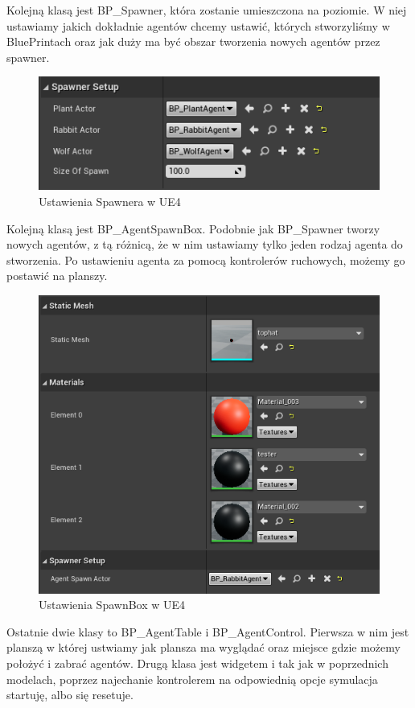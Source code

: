 \documentclass[a4paper,12pt,reqno]{article}
\begin{document}
Kolejną klasą jest BP\_Spawner, która zostanie umieszczona na poziomie. W niej ustawiamy jakich dokładnie agentów chcemy ustawić, których stworzyliśmy w BluePrintach oraz jak duży ma być obszar tworzenia nowych agentów przez spawner.

\begin{figure}[H]%
\centering
\includegraphics[width=0.6\columnwidth]{graphics//agent/BP_SpawnerAgent.png}
\caption{Ustawienia Spawnera w UE4 
\label{BPExample}}%
%
\qquad
\end{figure} 

Kolejną klasą jest BP\_AgentSpawnBox. Podobnie jak BP\_Spawner tworzy nowych agentów, z tą różnicą, że w nim ustawiamy tylko jeden rodzaj agenta do stworzenia. Po ustawieniu agenta za pomocą kontrolerów ruchowych, możemy go postawić na planszy.

\begin{figure}[H]%
\centering
\includegraphics[width=0.50\columnwidth]{graphics//agent/BP_AgentSpawnBox.png}
\caption{Ustawienia SpawnBox w UE4 
\label{BPExample}}%
%
\qquad
\end{figure} 

Ostatnie dwie klasy to BP\_AgentTable i BP\_AgentControl. Pierwsza w nim jest planszą w której ustwiamy jak plansza ma wyglądać oraz miejsce gdzie możemy położyć i zabrać agentów. Drugą klasa jest widgetem i tak jak w poprzednich modelach, poprzez najechanie kontrolerem na odpowiednią opcje symulacja startuję, albo się resetuje.
\end{document}
